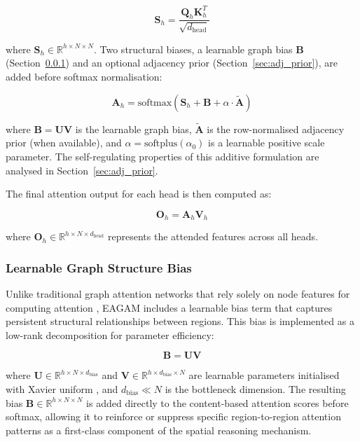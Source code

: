 \documentclass[a4paper,fleqn]{cas-dc}
\begin{document}
\begin{equation}
\mathbf{S}_h = \frac{\mathbf{Q}_h \mathbf{K}_h^T}{\sqrt{d_{\text{head}}}}
\end{equation}

where $\mathbf{S}_h \in \mathbb{R}^{h \times N \times N}$. Two structural biases, a learnable graph bias $\mathbf{B}$ (Section~\ref{sec:graph_bias}) and an optional adjacency prior (Section~\ref{sec:adj_prior}), are added before softmax normalisation:

\begin{equation}
\mathbf{A}_h = \text{softmax}(\mathbf{S}_h + \mathbf{B} + \alpha \cdot \tilde{\mathbf{A}})
\end{equation}

where $\mathbf{B} = \mathbf{UV}$ is the learnable graph bias, $\tilde{\mathbf{A}}$ is the row-normalised adjacency prior (when available), and $\alpha = \text{softplus}(\alpha_0)$ is a learnable positive scale parameter. The self-regulating properties of this additive formulation are analysed in Section~\ref{sec:adj_prior}.

The final attention output for each head is then computed as:

\begin{equation}
\mathbf{O}_h = \mathbf{A}_h \mathbf{V}_h
\end{equation}

where $\mathbf{O}_h \in \mathbb{R}^{h \times N \times d_{\text{head}}}$ represents the attended features across all heads.

\subsubsection{Learnable Graph Structure Bias}
\label{sec:graph_bias}

Unlike traditional graph attention networks that rely solely on node features for computing attention \cite{velickovic2017graph}, EAGAM includes a learnable bias term that captures persistent structural relationships between regions. This bias is implemented as a low-rank decomposition for parameter efficiency:

\begin{equation}
\mathbf{B} = \mathbf{U} \mathbf{V}
\end{equation}

where $\mathbf{U} \in \mathbb{R}^{h \times N \times d_{\text{bias}}}$ and $\mathbf{V} \in \mathbb{R}^{h \times d_{\text{bias}} \times N}$ are learnable parameters initialised with Xavier uniform \cite{glorot2010understanding}, and $d_{\text{bias}} \ll N$ is the bottleneck dimension. The resulting bias $\mathbf{B} \in \mathbb{R}^{h \times N \times N}$ is added directly to the content-based attention scores before softmax, allowing it to reinforce or suppress specific region-to-region attention patterns as a first-class component of the spatial reasoning mechanism.
\end{document}
